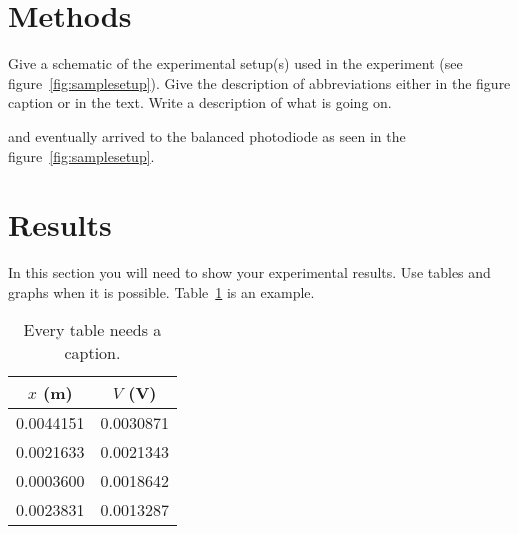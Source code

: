 \documentclass[letterpaper,12pt]{article}
\begin{document}
\blindtext %

\section{Methods}


Give a schematic of the experimental setup(s) used in the experiment (see
figure~\ref{fig:samplesetup}). Give the description of  abbreviations
either in the figure caption or in the text. Write a description of what is
going on. 


and eventually arrived to the
balanced photodiode as seen in the figure~\ref{fig:samplesetup}.


\section{Results}

In this section you will need to show your experimental results. Use tables and
graphs when it is possible. Table~\ref{tbl:bins} is an example.

\begin{table}[ht]
\begin{center}
\caption{Every table needs a caption.}
\label{tbl:bins} %
\begin{tabular}{|cc|} 
\hline
\multicolumn{1}{|c}{$x$ (m)} & \multicolumn{1}{c|}{$V$ (V)} \\
\hline
0.0044151 &   0.0030871 \\
0.0021633 &   0.0021343 \\
0.0003600 &   0.0018642 \\
0.0023831 &   0.0013287 \\
\hline
\end{tabular}
\end{center}
\end{table}
\end{document}
